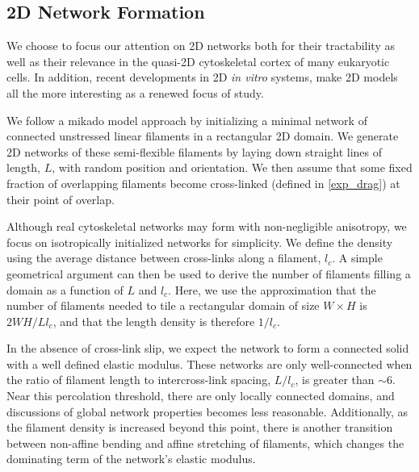 \documentclass[pre,preprint]{revtex4-1}
\begin{document}

\subsection{2D Network Formation}

We choose to focus our attention on 2D networks both for their tractability as well as their relevance in the quasi-2D cytoskeletal cortex of many eukaryotic cells\cite{cellmech_flows}.  In addition, recent developments in 2D {\em in vitro} systems\cite{rheo_2D1,rheo_2D2}, make 2D models all the more interesting as a renewed focus of study.

We follow a mikado model approach by initializing a minimal network of connected unstressed linear filaments in a rectangular 2D domain.  We generate 2D networks of these semi-flexible filaments by laying down straight lines of length, $L$, with random position and orientation. We then assume that some fixed fraction of overlapping filaments become cross-linked (defined in \ref{exp_drag}) at their point of overlap.

Although real cytoskeletal networks may form with non-negligible anisotropy,  we  focus on isotropically initialized networks for simplicity.  We define the density using the average distance between cross-links along a filament, $l_c$. A simple geometrical argument can then be used to derive the number of filaments filling a domain as a function of $L$ and $l_c$\cite{theo_hlm}.  Here, we use the approximation that the number of filaments needed to tile a rectangular domain of size $W \times H$  is $2WH/Ll_c$, and that the length density is therefore $1/l_c$. 

In the absence of cross-link slip, we expect the network to form a connected solid with a well defined elastic modulus\cite{theo_hlm,theo_hlm2}.  These networks are only well-connected when the ratio of filament length to intercross-link spacing, $L/l_c$, is greater than $\sim 6$.  Near this percolation threshold, there are only locally connected domains, and discussions of global network properties becomes less reasonable.  Additionally, as the filament density is increased beyond this point, there is another transition between non-affine bending and affine stretching of filaments, which changes the dominating term of the network's elastic modulus.
\end{document}
